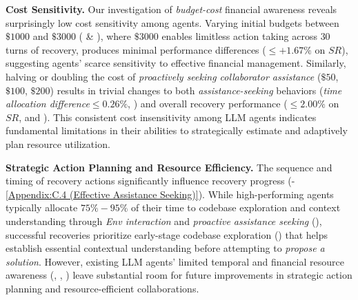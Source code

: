 \textbf{Cost Sensitivity.} 
Our investigation of \textit{budget-cost} financial awareness reveals surprisingly low cost sensitivity among agents. Varying initial budgets between $\$1000$ and $\$3000$ ( \& ), where $\$3000$ enables limitless action taking across $30$ turns of recovery, produces minimal performance differences ($\leq +1.67\%$ on $SR$), suggesting agents' scarce sensitivity to effective financial management.
Similarly, halving or doubling the cost of \textcolor{fig2_ask}{\textit{proactively seeking collaborator assistance}} ($\$50$, $\$100$, $\$200$) results in trivial changes to both \textcolor{fig2_ask}{\textit{assistance-seeking}} behaviors (\textit{time allocation difference}$\leq 0.26\%$, ) and overall recovery performance ($\leq 2.00\%$ on $SR$,  and ). This consistent cost insensitivity among LLM agents indicates fundamental limitations in their abilities to strategically estimate and adaptively plan resource utilization.




\textbf{Strategic Action Planning and Resource Efficiency.}
The sequence and timing of recovery actions significantly influence recovery progress (-\ref{Appendix:C.4 (Effective Assistance Seeking)}). While high-performing agents typically allocate $75\%-95\%$ of their time to codebase exploration and context understanding through \textcolor{fig2_env}{\textit{Env interaction}} and \textcolor{fig2_ask}{\textit{proactive assistance seeking}} (), successful recoveries prioritize early-stage codebase exploration () that helps establish essential contextual understanding before attempting to \textcolor{fig2_code}{\textit{propose a solution}}. However, existing LLM agents' limited temporal and financial resource awareness (, , ) leave substantial room for future improvements in strategic action planning and resource-efficient collaborations.


